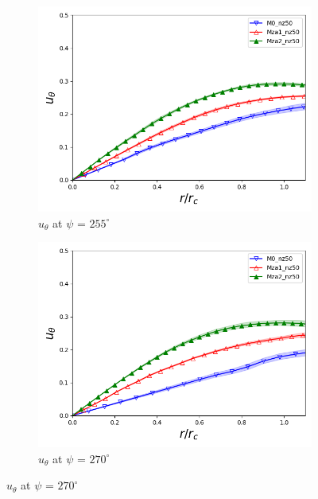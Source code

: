 \begin{figure}[H]
	\centering
	\begin{subfigure}[b]{0.475\textwidth}
		\centering
		\includegraphics[width=1\textwidth]{figures/zonal_adapt_results/LEV_Re200k/u_theta/phase_255.png}
		\caption{ $u_\theta$ at $\psi$ = $255^\circ$}
		\label{fig:zonal_utheta_255_Re200k}
	\end{subfigure}
	\begin{subfigure}[b]{0.475\textwidth}
		\centering
		\includegraphics[width=1\textwidth]{figures/zonal_adapt_results/LEV_Re200k/u_theta/phase_270.png}
		\caption{ $u_\theta$ at $\psi$ = $270^\circ$}
		\label{fig:zonal_utheta_270_Re200k}
	\end{subfigure}

\end{figure}
